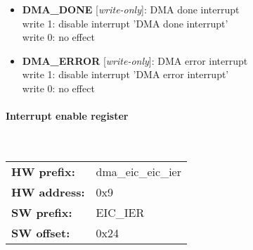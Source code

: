 \vspace{12pt}
\noindent
{}

\begin{itemize}
\item \begin{small}
{\bf 
DMA\_DONE
} [\emph{write-only}]: DMA done interrupt
\\
write 1: disable interrupt 'DMA done interrupt'\\write 0: no effect
\end{small}
\item \begin{small}
{\bf 
DMA\_ERROR
} [\emph{write-only}]: DMA error interrupt
\\
write 1: disable interrupt 'DMA error interrupt'\\write 0: no effect
\end{small}
\end{itemize}
\paragraph*{Interrupt enable register}\mbox{}\\\vskip 6pt
\begin{tabular}{l l }
{\bf HW prefix:}  & dma\_eic\_eic\_ier\\
{\bf HW address:}  & 0x9\\
{\bf SW prefix:}  & EIC\_IER\\
{\bf SW offset:}  & 0x24\\
\end{tabular}

